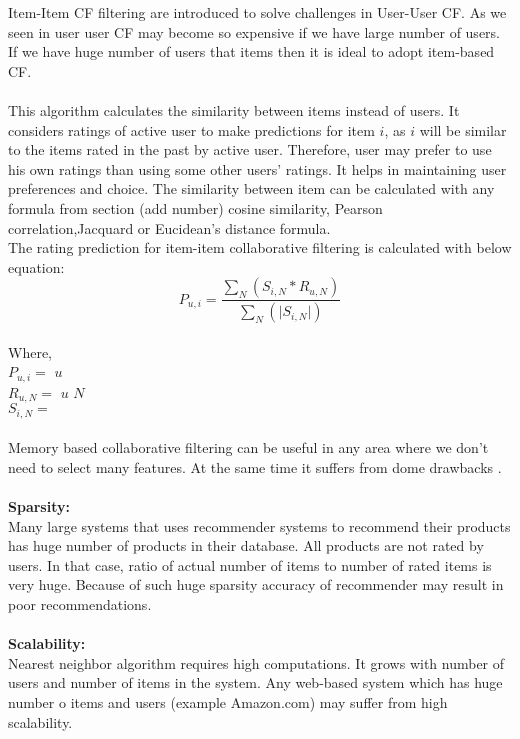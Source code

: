 Item-Item CF filtering are introduced to solve challenges in User-User CF. As we seen in user user CF may become so expensive if we have large number of users. If we have huge number of users that items then it is ideal to adopt item-based CF.
\\
\\
This algorithm calculates the similarity between items instead of users. It considers ratings of active user to make predictions for item $i$, as $i$ will be similar to the items rated in the past by active user. Therefore, user may prefer to use his own ratings than using some other users' ratings. It helps in maintaining user preferences and choice. The similarity between item can be calculated with any formula from section (add number) cosine similarity, Pearson
correlation,Jacquard or Eucidean's distance formula.
\\
The rating prediction for item-item collaborative filtering is calculated with below equation:
\begin{equation}
P_{u,i} = \frac { \sum_N(S_{i,N} * R_{u,N})}{\sum_N (\vert S_{i,N} \vert)}
\end{equation}
\\
Where, 
\\
\noindent
$P_{u,i} = $  $u$ 
\\
$R_{u,N} = $  $u$  $N$ 
\\
$S_{i,N} = $ 
\\
\\
Memory based collaborative filtering can be useful in any area where we don't need to select many features. At the same time it suffers from dome drawbacks \cite{10}.
\\
\\
\textbf{Sparsity:}
\\
Many large systems that uses recommender systems to recommend their products has huge number of products in their database. All products are not rated by users. In that case, ratio of actual number of items to number of rated items is very huge. Because of such huge sparsity accuracy of recommender may result in poor recommendations.
\\
\\
\textbf{Scalability:}
\\
Nearest neighbor algorithm requires high computations. It grows with number of users and number of items in the system. Any web-based system which has huge number o items and users (example Amazon.com) may suffer from high scalability.


